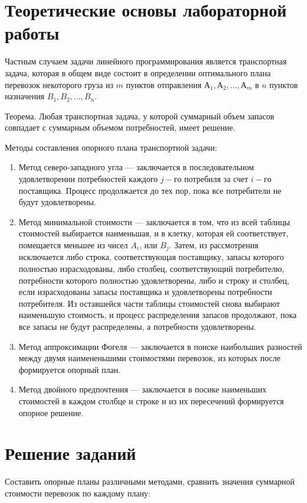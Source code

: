 \documentclass[12pt]{article}
\begin{document}
\section*{Теоретические основы лабораторной работы}
Частным случаем задачи линейного программирования является транспортная задача, которая в общем виде состоит в определении оптимального плана перевозок некоторого груза из $m$ пунктов отправления
 $А_1 , А_2 , ..., А_m$ в $n$ пунктов назначения  $B_1 , B_2 , ..., B_n$. 

Теорема. Любая транспортная задача, у которой суммарный объем запасов совпадает с
суммарным объемом потребностей, имеет решение.

Методы составления опорного плана транспортной задачи:
\begin{enumerate}
\item Метод северо-западного угла --- заключается в последовательном удовлетворении потребностей каждого $j-го$ потребиля за счет $i-го$  поставщика. Процесс
продолжается до тех пор, пока все потребители не будут удовлетворены.
\item Метод минимальной стоимости --- заключается в том, что из всей таблицы стоимостей выбирается наименьшая,
и в клетку, которая ей соответствует, помещается меньшее из чисел $A_i$, или $B_j$. Затем, из
рассмотрения исключается либо строка, соответствующая поставщику, запасы которого
полностью израсходованы, либо столбец, соответствующий потребителю, потребности
которого полностью удовлетворены, либо и строку и столбец, если израсходованы запасы
поставщика и удовлетворены потребности потребителя. Из оставшейся части таблицы
стоимостей снова выбирают наименьшую стоимость, и процесс распределения запасов
продолжают, пока все запасы не будут распределены, а потребности удовлетворены.
\item Метод аппроксимации Фогеля --- заключается в поиске наибольших разностей между двумя наимененьшими стоимостями перевозок, из которых после формируется опорный план.
\item Метод двойного предпочтения --- заключается в посике наименьших стоимостей в каждом столбце и строке и из их пересечений формируется опорное решение.
\end{enumerate}

\newpage
\section*{Решение заданий}

Составить опорные планы различными методами, сравнить значения суммарной
стоимости перевозок по каждому плану: 
\end{document}
